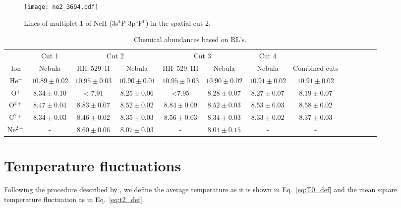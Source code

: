 \documentclass[fleqn,usenatbib]{mnras}
\begin{document}
\begin{figure}
\texttt{[image: ne2\_3694.pdf]}
\caption{Lines of multiplet 1 of Ne\thinspace II (3s$^{4}$P-3p$^{4}$P$^{0}$) in the spatial cut 2.}
\label{fig:neii_lines}
\end{figure}


\begin{table*}
\centering
\caption{Chemical abundances based on RL's.}
\label{tab:rls_abundances}
\begin{adjustbox}{width=\textwidth}
\begin{tabular}{ccccccccccccc}
\hline
 & \multicolumn{1}{c}{Cut 1} & \multicolumn{2}{c}{Cut 2} & \multicolumn{2}{c}{Cut 3} & \multicolumn{1}{c}{Cut 4} \\
Ion &  Nebula & HH~529~II &  Nebula & HH~529~III &  Nebula &  Nebula & Combined cuts\\
\hline


He$^{+}$ & $10.89 \pm 0.02$ & $10.95 \pm 0.03$ & $10.90 \pm 0.01$ & $10.95 \pm 0.03$ & $10.90 \pm 0.02$ & $10.91 \pm 0.02$ & $10.91 \pm 0.02$\\

O$^{+}$ & $8.34 \pm 0.10$ & < 7.91 & $8.25 \pm 0.06$ & <7.95 & $8.28 \pm 0.07$ & $8.27 \pm 0.07$ & $8.19 \pm 0.07$\\

O$^{2+}$ & $8.47 \pm 0.04$ & $8.83 \pm 0.07$ & $8.52 \pm 0.02$ & $8.84 \pm 0.09$ & $8.52 \pm 0.03$ & $8.53 \pm 0.03$ & $8.58 \pm 0.02$\\

C$^{2+}$ & $8.34 \pm 0.03$ & $8.46 \pm 0.02$ & $8.35 \pm 0.03$ & $8.56 \pm 0.03$ & $8.34 \pm 0.03$ & $8.33 \pm 0.02$ & $8.37 \pm 0.03$ \\

Ne$^{2+}$ & - & $8.60 \pm 0.06$ & $8.07 \pm 0.03$ & - & $8.04 \pm 0.15$&- &-\\

\hline
\end{tabular}
\end{adjustbox}
\end{table*}





\section{Temperature fluctuations}
\label{sec:temp_fluc}

Following the procedure described by \citet{Peimbert67}, we define the average temperature as it is shown in Eq.~\eqref{eq:T0_def} and the mean square temperature fluctuation as in Eq.~\eqref{eq:t2_def}.
\end{document}

